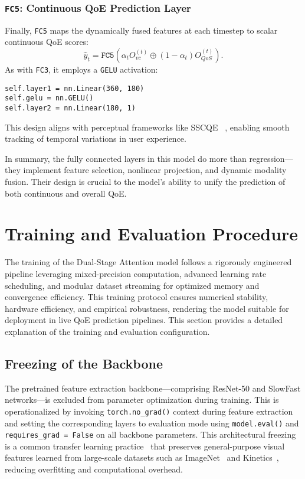 \subsubsection*{\texttt{FC5}: Continuous QoE Prediction Layer}

Finally, \texttt{FC5} maps the dynamically fused features at each timestep to scalar continuous QoE scores:
\begin{equation}
    \hat{y}_t = \texttt{FC5} \left( \alpha_t O_{vc}^{(t)} \oplus (1 - \alpha_t) O_{QoS}^{(t)} \right).
\end{equation}
As with \texttt{FC3}, it employs a \texttt{GELU} activation:
\begin{verbatim}
self.layer1 = nn.Linear(360, 180)
self.gelu = nn.GELU()
self.layer2 = nn.Linear(180, 1)
\end{verbatim}
This design aligns with perceptual frameworks like SSCQE ~\cite{alpert1991sscqe}, enabling smooth tracking of temporal variations in user experience.

\bigskip
In summary, the fully connected layers in this model do more than regression—they implement feature selection, nonlinear projection, and dynamic modality fusion. Their design is crucial to the model's ability to unify the prediction of both continuous and overall QoE.

\section{Training and Evaluation Procedure}
\label{sec:training-evaluation}

The training of the Dual-Stage Attention model follows a rigorously engineered pipeline leveraging mixed-precision computation, advanced learning rate scheduling, and modular dataset streaming for optimized memory and convergence efficiency. This training protocol ensures numerical stability, hardware efficiency, and empirical robustness, rendering the model suitable for deployment in live QoE prediction pipelines. This section provides a detailed explanation of the training and evaluation configuration.

\subsection{Freezing of the Backbone}
The pretrained feature extraction backbone---comprising ResNet-50 and SlowFast networks---is excluded from parameter optimization during training. This is operationalized by invoking \texttt{torch.no\_grad()} context during feature extraction and setting the corresponding layers to evaluation mode using \texttt{model.eval()} and \texttt{requires\_grad = False} on all backbone parameters. This architectural freezing is a common transfer learning practice~\cite{yosinski2014transferable} that preserves general-purpose visual features learned from large-scale datasets such as ImageNet~\cite{deng2009imagenet} and Kinetics~\cite{kay2017kinetics}, reducing overfitting and computational overhead.

